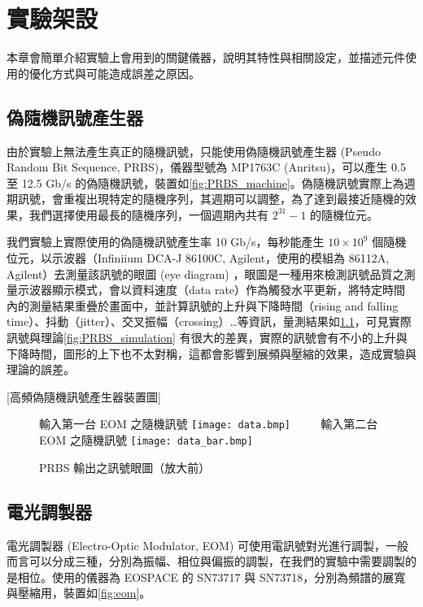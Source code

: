 \documentclass[class=NCU_thesis, crop=false]{standalone}
\begin{document}
\chapter{實驗架設}
本章會簡單介紹實驗上會用到的關鍵儀器，說明其特性與相關設定，並描述元件使用的優化方式與可能造成誤差之原因。

\section{偽隨機訊號產生器}
由於實驗上無法產生真正的隨機訊號，只能使用偽隨機訊號產生器 (Pseudo Random Bit Sequence, PRBS)，儀器型號為 MP1763C (Anritsu)，可以產生 0.5 至 12.5 Gb/s 的偽隨機訊號，裝置如\cref{fig:PRBS_machine}。偽隨機訊號實際上為週期訊號，會重複出現特定的隨機序列，其週期可以調整，為了達到最接近隨機的效果，我們選擇使用最長的隨機序列，一個週期內共有 $2^{31}-1$ 的隨機位元。

我們實驗上實際使用的偽隨機訊號產生率 10 Gb/s，每秒能產生 $10\times 10^{9}$ 個隨機位元，以示波器（Infiniium DCA-J 86100C, Agilent，使用的模組為 86112A, Agilent）去測量該訊號的眼圖 (eye diagram) ，眼圖是一種用來檢測訊號品質之測量示波器顯示模式，會以資料速度（data rate）作為觸發水平更新，將特定時間內的測量結果重疊於畫面中，並計算訊號的上升與下降時間（rising and falling time）、抖動（jitter）、交叉振幅（crossing）\dots 等資訊，量測結果如\cref{fig:prbs_eye}，可見實際訊號與理論\cref{fig:PRBS_simulation} 有很大的差異，實際的訊號會有不小的上升與下降時間，圖形的上下也不太對稱，這都會影響到展頻與壓縮的效果，造成實驗與理論的誤差。

[高頻偽隨機訊號產生器裝置圖]


\begin{figure}[!hbt]
    \centering
    \subcaptionbox
        {輸入第一台 EOM 之隨機訊號
        \label{fig:subfig_fig1}}
        {\texttt{[image: data.bmp]}}
    ~~~~
    \subcaptionbox
        {輸入第二台 EOM 之隨機訊號
        \label{fig:subfig_fig2}}
        {\texttt{[image: data\_bar.bmp]}}
    \caption{PRBS 輸出之訊號眼圖（放大前）}
    \label{fig:prbs_eye}
\end{figure}

\section{電光調製器}

電光調製器 (Electro-Optic Modulator, EOM) 可使用電訊號對光進行調製，一般而言可以分成三種，分別為振幅、相位與偏振的調製，在我們的實驗中需要調製的是相位。使用的儀器為 EOSPACE 的 SN73717 與 SN73718，分別為頻譜的展寬與壓縮用，裝置如\cref{fig:eom}。
\end{document}
